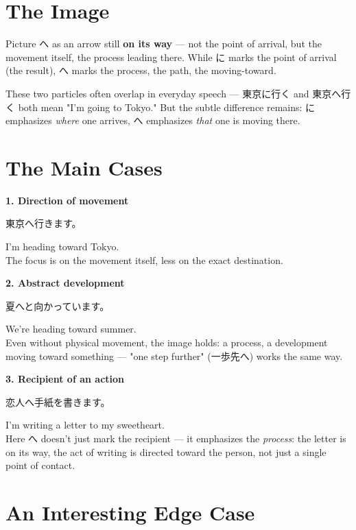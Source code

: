 \documentclass[12pt]{book}
\begin{document}
\section*{The Image}

Picture へ as an arrow still \textbf{on its way} — not the point of arrival, but the movement itself, the process leading there. While に marks the point of arrival (the result), へ marks the process, the path, the moving-toward.

These two particles often overlap in everyday speech — 東京に行く and 東京へ行く both mean "I'm going to Tokyo." But the subtle difference remains: に emphasizes \emph{where} one arrives, へ emphasizes \emph{that} one is moving there.

\section*{The Main Cases}

\textbf{1. Direction of movement}
\par\quad 東京へ行きます。\\
\par\quad I'm heading toward Tokyo.\\

The focus is on the movement itself, less on the exact destination.

\textbf{2. Abstract development}
\par\quad 夏へと向かっています。\\
\par\quad We're heading toward summer.\\

Even without physical movement, the image holds: a process, a development moving toward something — "one step further" (一歩先へ) works the same way.

\textbf{3. Recipient of an action}
\par\quad 恋人へ手紙を書きます。\\
\par\quad I'm writing a letter to my sweetheart.\\

Here へ doesn't just mark the recipient — it emphasizes the \emph{process}: the letter is on its way, the act of writing is directed toward the person, not just a single point of contact.

\section*{An Interesting Edge Case}
\end{document}
